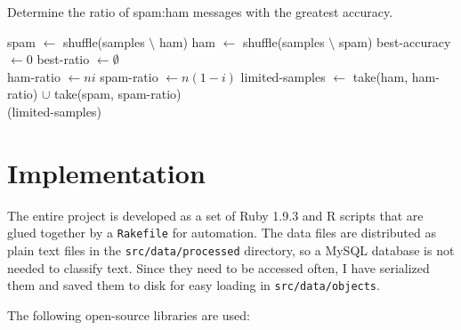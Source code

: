\documentclass[10pt]{article}
\begin{document}
\begin{algorithm}[h]
  \caption{Determine the ratio of spam:ham messages with the greatest accuracy.}
  \label{algo:ratio}
  \begin{algorithmic}
    \State spam $\gets$ {\sc shuffle}(samples $\setminus $ ham)
    \State ham $\gets$ {\sc shuffle}(samples $\setminus $ spam)
    \State best-accuracy $\gets 0$
    \State best-ratio $\gets \emptyset$
    \\

    \State ham-ratio $\gets ni$
    \State spam-ratio $\gets n(1 - i)$
    \State limited-samples $\gets$ {\sc take}(ham, ham-ratio) $\cup$ {\sc take}(spam, spam-ratio)
    \\

    (limited-samples)

    \EndIf
    \EndFor
    \State {}
    \EndFunction
  \end{algorithmic}
\end{algorithm}

\section{Implementation}
\label{a:implementation}
The entire project is developed as a set of Ruby 1.9.3 and R scripts that are
glued together by a \texttt{Rakefile} for automation. The data files are
distributed as plain text files in the \texttt{src/data/processed} directory,
so a MySQL database is not needed to classify text. Since they need to be
accessed often, I have serialized them and saved them to disk for easy loading
in \texttt{src/data/objects}.

The following open-source libraries are used:
\end{document}
